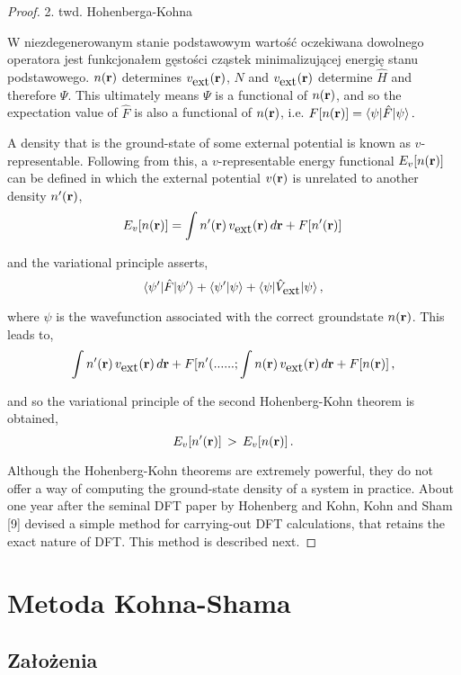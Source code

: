 \begin{proof}
2. twd. Hohenberga-Kohna

W niezdegenerowanym stanie podstawowym wartość oczekiwana dowolnego
operatora jest funkcjonałem gęstości cząstek minimalizującej energię
stanu podstawowego. $n({\bf r})$ determines $v_{\hbox{ext}}({\bf r})$,
$N$ and $v_{\hbox{ext}}({\bf r})$ determine $\hat{H}$ and therefore
$\Psi$. This ultimately means $\Psi$ is a functional of $n({\bf r})$,
and so the expectation value of $\hat{F}$ is also a functional of
$n({\bf r})$, i.e. ${\displaystyle F[n({\bf r})]=\langle\psi\vert\hat{F}\vert\psi\rangle\,.}$

A density that is the ground-state of some external potential is known
as $v$-representable. Following from this, a $v$-representable energy
functional $E_{v}[n({\bf r})]$ can be defined in which the external
potential $v({\bf r})$ is unrelated to another density $n'({\bf r})$,
\[
E_{v}[n({\bf r})]=\int n'({\bf r})\,v_{\hbox{ext}}({\bf r})\,d{\bf r}+F[n'({\bf r})]\,
\]


and the variational principle asserts, 
\[
{\displaystyle \langle\psi'\vert\hat{F}\vert\psi'\rangle+\langle\psi'\vert\psi\rangle+\langle\psi\vert\hat{V}_{\hbox{ext}}\vert\psi\rangle\thinspace,}
\]
 

where $\psi$ is the wavefunction associated with the correct groundstate
$n({\bf r})$. This leads to, 
\[
{\displaystyle \int n'({\bf r})\,v_{\hbox{ext}}({\bf r})\,d{\bf r}+F[n'(......;\int n({\bf r})\,v_{\hbox{ext}}({\bf r})\,d{\bf r}+F[n({\bf r})]\,,}
\]


and so the variational principle of the second Hohenberg-Kohn theorem
is obtained, 
\[
\ensuremath{{\displaystyle E_{v}[n'({\bf r})]\,>\,E_{v}[n({\bf r})]\,.}}
\]


Although the Hohenberg-Kohn theorems are extremely powerful, they
do not offer a way of computing the ground-state density of a system
in practice. About one year after the seminal DFT paper by Hohenberg
and Kohn, Kohn and Sham {[}9{]} devised a simple method for carrying-out
DFT calculations, that retains the exact nature of DFT. This method
is described next. 
\end{proof}

\newpage
\section{Metoda Kohna-Shama}


\subsection{Założenia}

